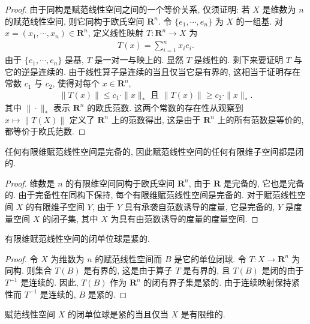 \documentclass[../../main.tex]{subfiles}
\begin{document}
\begin{proof}
由于同构是赋范线性空间之间的一个等价关系, 仅须证明: 若 $X$ 是维数为 $n$ 的赋范线性空间, 则它同构于欧氏空间 $\mathbf{R}^{n}$. 令 $\{e_{1},\cdots,e_{n}\}$ 为 $X$ 的一组基. 对 $x=(x_{1},\cdots,x_{n})\in\mathbf{R}^{n}$, 定义线性映射 $T:\mathbf{R}^{n}\to X$ 为
\begin{align*}
T(x)=\sum_{i=1}^{n}x_{i}e_{i}.
\end{align*}
由于 $\{e_{1},\cdots,e_{n}\}$ 是基, $T$ 是一对一与映上的. 显然 $T$ 是线性的. 剩下来要证明 $T$ 与它的逆是连续的. 由于线性算子是连续的当且仅当它是有界的, 这相当于证明存在常数 $c_{1}$ 与 $c_{2}$, 使得对每个 $x\in\mathbf{R}^{n}$,
\begin{align*}
\|T(x)\|\leqslant c_{1}\cdot\|x\|_{*}\text{ 且 }\|T(x)\|\geqslant c_{2}\cdot\|x\|_{*}.
\end{align*}
其中 $\|\cdot\|_{*}$ 表示 $\mathbf{R}^{n}$ 的欧氏范数. 这两个常数的存在性从观察到 $x\mapsto\|T(X)\|$ 定义了 $\mathbf{R}^{n}$ 上的范数得出, 这是由于 $\mathbf{R}^{n}$ 上的所有范数是等价的, 都等价于欧氏范数.
\end{proof}

\begin{corollary}\label{corollary:ch13-有限维完备}
任何有限维赋范线性空间是完备的, 因此赋范线性空间的任何有限维子空间都是闭的.
\end{corollary}

\begin{proof}
维数是 $n$ 的有限维空间同构于欧氏空间 $\mathbf{R}^{n}$, 由于 $\mathbf{R}$ 是完备的, 它也是完备的. 由于完备性在同构下保持, 每个有限维赋范线性空间是完备的. 对于赋范线性空间 $X$ 的有限维子空间 $Y$, 由于 $Y$ 具有承袭自范数诱导的度量, 它是完备的, $Y$ 是度量空间 $X$ 的闭子集, 其中 $X$ 为具有由范数诱导的度量的度量空间.
\end{proof}

\begin{corollary}\label{corollary:ch13-有限维闭球紧}
有限维赋范线性空间的闭单位球是紧的.
\end{corollary}

\begin{proof}
令 $X$ 为维数为 $n$ 的赋范线性空间而 $B$ 是它的单位闭球. 令 $T:X\to\mathbf{R}^{n}$ 为同构. 则集合 $T(B)$ 是有界的, 这是由于算子 $T$ 是有界的, 且 $T(B)$ 是闭的由于 $T^{-1}$ 是连续的. 因此, $T(B)$ 作为 $\mathbf{R}^{n}$ 的闭有界子集是紧的. 由于连续映射保持紧性而 $T^{-1}$ 是连续的, $B$ 是紧的.
\end{proof}

\begin{theorem}[Riesz 定理]\label{theorem:ch13-Riesz}
赋范线性空间 $X$ 的闭单位球是紧的当且仅当 $X$ 是有限维的.
\end{theorem}
\end{document}
